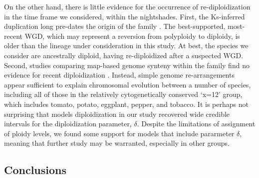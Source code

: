 On the other hand, there is little evidence for the occurrence of re-diploidization in the time frame we considered, within the nightshades.
First, the Ks-inferred duplication long pre-dates the origin of the family \citep{sarkinen_2013}. 
The best-supported, most-recent WGD, which may represent a reversion from polyploidy to diploidy, is older than the lineage under consideration in this study.
At best, the species we consider are ancestrally diploid, having re-diploidized after a suspected WGD.
Second, studies comparing map-based genome synteny within the family find no evidence for recent diploidization \citep{wu_2010a}.
Instead, simple genome re-arrangements appear sufficient to explain chromosomal evolution between a number of species, including all of those in the relatively cytogenetically conserved `x=12' group, which includes tomato, potato, eggplant, pepper, and tobacco.
It is perhaps not surprising that models diploidization in our study recovered wide credible intervals for the diploidization parameter, $\delta$. 
Despite the limitations of assignment of ploidy levels, we found some support for models that include pararmeter $\delta$, meaning that further study may be warranted, especially in other groups.

%

\bigskip


\subsection*{Conclusions}

